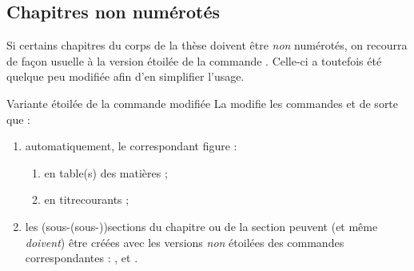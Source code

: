\subsection{Chapitres non numérotés}
\label{sec-chap-non-numer}%
%

Si certains chapitres du corps de la thèse  doivent être \emph{non} numérotés, on recourra de
façon usuelle à la version étoilée de la commande
. Celle-ci a toutefois été quelque peu modifiée afin
d'en simplifier l'usage.


\begin{dbremark}{Variante étoilée de la commande \protect{} modifiée}{}
  La \yatCl{} modifie les commandes  et
   de sorte que :
  \begin{enumerate}
  \item automatiquement, le  correspondant figure :
    \begin{enumerate}
    \item en table(s) des matières ;
    \item en \glspl{titrecourant} ;
    \end{enumerate}
  \item les (sous-(sous-))sections du chapitre ou de la section peuvent (et même
    \emph{doivent}) être créées avec les versions \emph{non} étoilées des
    commandes correspondantes : ,
     et .
  \end{enumerate}
\end{dbremark}

